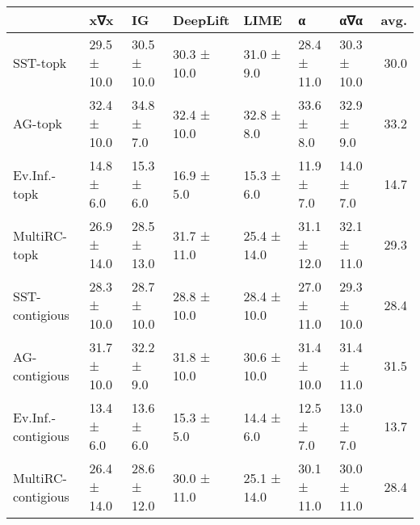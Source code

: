 \begin{tabular}{lllllllr}
\toprule
{} &          x∇x &           IG &     DeepLift &         LIME &            α &          α∇α &  avg. \\
\midrule
SST-topk           &  29.5 ± 10.0 &  30.5 ± 10.0 &  30.3 ± 10.0 &   31.0 ± 9.0 &  28.4 ± 11.0 &  30.3 ± 10.0 &  30.0 \\
AG-topk            &  32.4 ± 10.0 &   34.8 ± 7.0 &  32.4 ± 10.0 &   32.8 ± 8.0 &   33.6 ± 8.0 &   32.9 ± 9.0 &  33.2 \\
Ev.Inf.-topk       &   14.8 ± 6.0 &   15.3 ± 6.0 &   16.9 ± 5.0 &   15.3 ± 6.0 &   11.9 ± 7.0 &   14.0 ± 7.0 &  14.7 \\
MultiRC-topk       &  26.9 ± 14.0 &  28.5 ± 13.0 &  31.7 ± 11.0 &  25.4 ± 14.0 &  31.1 ± 12.0 &  32.1 ± 11.0 &  29.3 \\
SST-contigious     &  28.3 ± 10.0 &  28.7 ± 10.0 &  28.8 ± 10.0 &  28.4 ± 10.0 &  27.0 ± 11.0 &  29.3 ± 10.0 &  28.4 \\
AG-contigious      &  31.7 ± 10.0 &   32.2 ± 9.0 &  31.8 ± 10.0 &  30.6 ± 10.0 &  31.4 ± 10.0 &  31.4 ± 11.0 &  31.5 \\
Ev.Inf.-contigious &   13.4 ± 6.0 &   13.6 ± 6.0 &   15.3 ± 5.0 &   14.4 ± 6.0 &   12.5 ± 7.0 &   13.0 ± 7.0 &  13.7 \\
MultiRC-contigious &  26.4 ± 14.0 &  28.6 ± 12.0 &  30.0 ± 11.0 &  25.1 ± 14.0 &  30.1 ± 11.0 &  30.0 ± 11.0 &  28.4 \\
\bottomrule
\end{tabular}
